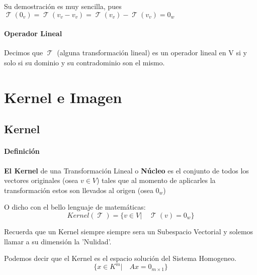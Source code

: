 \documentclass[12pt]{report}                                    %
\DeclareMathOperator \LinealTransformation {\mathcal{T}}
\begin{document}
            Su demostración es muy sencilla, pues
            $\LinealTransformation(0_v)=\LinealTransformation(v_v-v_v)=\LinealTransformation(v_v)-\LinealTransformation(v_v)=0_w$

        \subsubsection{Operador Lineal}
            Decimos que $\LinealTransformation$ (alguna transformación lineal) es un
            operador lineal en V si y solo si su dominio y su contradominio son el mismo.


\chapter{Kernel e Imagen}

    \clearpage
    \section{Kernel}
        \subsubsection{Definición}
        \textbf{El Kernel} de una Transformación Lineal o \textbf{Núcleo} es el conjunto 
        de todos los vectores originales (osea $v \in V$) tales que al momento de
        aplicarles la transformación estos son llevados al origen (osea $0_w$)

        O dicho con el bello lenguaje de matemáticas:
        \begin{equation}
            Kernel(\LinealTransformation) = \{v \in V |\quad \LinealTransformation(v) = 0_w\}
        \end{equation}

        Recuerda que un Kernel siempre siempre sera un Subespacio Vectorial y solemos
        llamar a su dimensión la 'Nulidad'.

        Podemos decir que el Kernel es el espacio solución del Sistema Homogeneo.
        \begin{equation*}
            \{x \in K^m |\quad Ax = 0_{m \times 1} \}
        \end{equation*}
\end{document}
